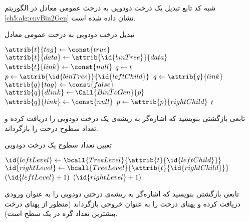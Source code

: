 
شبه کد تابع تبدیل یک درخت دودویی به درخت عمومی معادل‌ در الگوریتم {\ref{ch5:alg:cnvBin2Gen}} نشان داده شده است. 
\begin{algorithm}
\caption{تبدیل درخت دودویی به درخت عمومی معادل}\label{ch5:alg:cnvBin2Gen}
\begin{latin}
\begin{algorithmic}[1]
				\State	\Return {}
		\EndIf
		\State	{}
		\State	$\attrib{t}{tag} \gets \const{true}$
		\State	$\attrib{t}{data} \gets \attrib{\id{binTree}}{data}$
		\State	$\attrib{t}{link} \gets \const{null}$
		\State	$q \gets t$
		\State	$p \gets \attrib{\id{binTree}}{\id{leftChild}}$
				\State	{}
				\State	$q \gets \attrib{q}{link}$
				\State	$\attrib{q}{tag} \gets \const{false}$
				\State	$\attrib{q}{dlink} \gets \Call{BinToGen}{p}$
				\State	$\attrib{q}{link} \gets \const{null}$
				\State	$p \gets \attrib{p}{rightChild}$
		\EndWhile
		\State	\Return $t$
\EndFunction
\end{algorithmic}
\end{latin}
\end{algorithm}

 تابعی بازگشتی بنویسید که اشاره‌گر به ریشه‌ی یک درخت دودویی را دریافت کرده و تعداد سطوح درخت را بازگرداند.


\begin{algorithm}
\caption{تعیین تعداد سطوح یک درخت دودویی}\label{ch5:alg:treeLevel}
\begin{latin}
\begin{algorithmic}[1]
			\State	{}
		\Else
			\State	$\id{leftLevel} \gets \bcall{TreeLevel}{\attrib{t}{\id{leftChild}}}$
			\State	$\id{rightLevel} \gets \bcall{TreeLevel}{\attrib{t}{\id{rightChild}}}$			
				\State	\Return	$(\id{leftLevel} + 1)$
			\Else
				\State	\Return $(\id{rightLevel} + 1)$
			\EndIf
		\EndIf
\EndFunction
\end{algorithmic}
\end{latin}
\end{algorithm}

 تابعی بازگشتی بنویسید که اشاره‌گر به ریشه‌ی درختی دودویی را به عنوان ورودی دریافت کرده و پهنای درخت را به عنوان خروجی بازگرداند (منظور از پهنای درخت بیشترین تعداد گره در یک سطح است).

